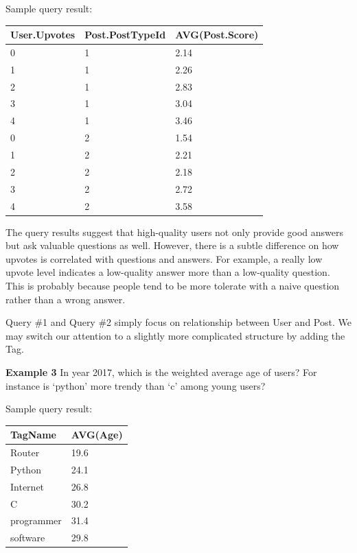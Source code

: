 
Sample query result:

\begin {center}
\begin{tabular}{ l l l }
	User.Upvotes&Post.PostTypeId&AVG(Post.Score)\\\hline
	0&1&2.14\\
	1&1&2.26\\
	2&1&2.83\\
	3&1&3.04\\
	4&1&3.46\\
	0&2&1.54\\
	1&2&2.21\\
	2&2&2.18\\
	3&2&2.72\\
	4&2&3.58\\\hline
\end{tabular}
\end {center}

The query results suggest that high-quality users not only provide good answers but ask valuable questions as well. However, there is a subtle difference on how upvotes is correlated with questions and answers. For example, a really low upvote level indicates a low-quality answer more than a low-quality question. This is probably because people tend to be more tolerate with a naive question rather than a wrong answer.

Query \#1 and Query \#2 simply focus on relationship between User and Post. We may switch our attention to a slightly more complicated structure by adding the Tag.

\noindent\textbf{Example 3} In year 2017, which is the weighted average age of users? For instance is ‘python’ more trendy than ‘c’ among young users?


Sample query result:

\begin {center}
\begin{tabular}{ l l  }
	
	TagName&AVG(Age)\\\hline
	Router&19.6\\
	Python&24.1\\
	Internet&26.8\\
	C&30.2\\
	programmer&31.4\\
	software&29.8\\\hline
	
\end{tabular}
\end {center}

